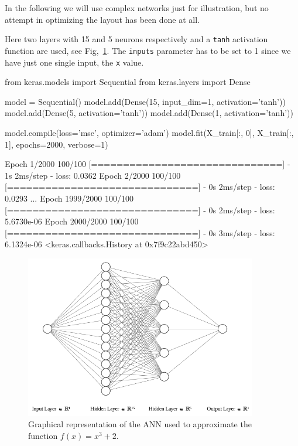 In the following we will use complex networks just for illustration, but no attempt in optimizing the layout has been done at all.

Here two layers with 15 and 5 neurons respectively and a \texttt{tanh} activation function are used, see Fig,~\ref{fig:ann_1}. The \texttt{inputs} parameter has to be set to 1 since we have just one single input, the \texttt{x} value.

\begin{ipython}
from keras.models import Sequential
from keras.layers import Dense

model = Sequential()
model.add(Dense(15, input_dim=1, activation='tanh'))
model.add(Dense(5, activation='tanh'))
model.add(Dense(1, activation='tanh'))

model.compile(loss='mse', optimizer='adam')
model.fit(X_train[:, 0], X_train[:, 1], epochs=2000, verbose=1)
\end{ipython}
\begin{ioutput}
Epoch 1/2000
100/100 [==============================] - 1s 2ms/step - loss: 0.0362
Epoch 2/2000
100/100 [==============================] - 0s 2ms/step - loss: 0.0293
...
Epoch 1999/2000
100/100 [==============================] - 0s 2ms/step - loss: 5.6730e-06
Epoch 2000/2000
100/100 [==============================] - 0s 3ms/step - loss: 6.1324e-06
<keras.callbacks.History at 0x7f9c22abd450>
\end{ioutput}

\begin{figure}[htb]
\centering
\includegraphics[width=0.9\textwidth]{figures/ann_1.png}
\caption{Graphical representation of the ANN used to approximate the function $f(x) = x^3 + 2$.}
\label{fig:ann_1}
\end{figure}

